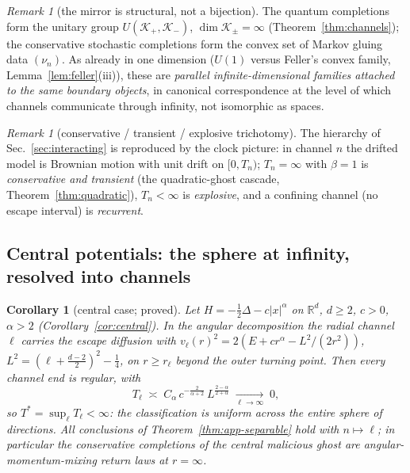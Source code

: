 \documentclass[11pt]{article}
\newtheorem{corollary}[theorem]{Corollary}
\theoremstyle{definition}
\theoremstyle{remark}
\newtheorem{remark}[theorem]{Remark}
\begin{document}
\begin{remark}[the mirror is structural, not a bijection]
The quantum completions form the unitary group
$U(\mathcal K_{+},\mathcal K_{-})$, $\dim\mathcal K_{\pm}=\infty$
(Theorem~\ref{thm:channels}); the conservative stochastic completions
form the convex set of Markov gluing data $(\nu_{n})$. As already in
one dimension ($U(1)$ versus Feller's convex family,
Lemma~\ref{lem:feller}(iii)), these are \emph{parallel
infinite-dimensional families attached to the same boundary objects},
in canonical correspondence at the level of which channels communicate
through infinity, not isomorphic as spaces.
\end{remark}

\begin{remark}[conservative / transient / explosive trichotomy]
The hierarchy of Sec.~\ref{sec:interacting} is reproduced by the clock
picture: in channel $n$ the drifted model is Brownian motion with unit
drift on $[0,T_{n})$; $T_{n}=\infty$ with $\beta=1$ is
\emph{conservative and transient} (the quadratic-ghost cascade,
Theorem~\ref{thm:quadratic}), $T_{n}<\infty$ is \emph{explosive}, and a
confining channel (no escape interval) is \emph{recurrent}.
\end{remark}

\subsection{Central potentials: the sphere at infinity, resolved into
channels}
\label{app:multiD-central}

\begin{corollary}[central case; proved]\label{cor:app-central}
Let $H=-\tfrac12\Delta-c|x|^{\alpha}$ on $\mathbb R^{d}$, $d\ge2$,
$c>0$, $\alpha>2$ (Corollary~\ref{cor:central}). In the angular
decomposition the radial channel $\ell$ carries the escape diffusion
with $v_{\ell}(r)^{2}=2(E+cr^{\alpha}-L^{2}/(2r^{2}))$,
$L^{2}=(\ell+\tfrac{d-2}{2})^{2}-\tfrac14$, on $r\ge r_{\ell}$ beyond
the outer turning point. Then every channel end is regular, with
\[
T_{\ell}\;\asymp\;C_{\alpha}\,c^{-\frac{2}{\alpha+2}}\,
L^{\frac{2-\alpha}{2+\alpha}}\;\xrightarrow[\ell\to\infty]{}\;0,
\]
so $T^{*}=\sup_{\ell}T_{\ell}<\infty$: the classification is uniform
across the entire sphere of directions. All conclusions of
Theorem~\ref{thm:app-separable} hold with $n\mapsto\ell$; in particular
the conservative completions of the central malicious ghost are
angular-momentum-mixing return laws at $r=\infty$.
\end{corollary}
\end{document}
